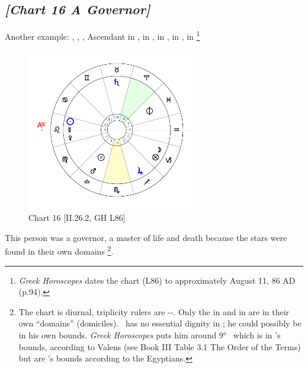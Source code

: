 \newpage
\subsection*{\textit{[Chart 16 A Governor]}}

Another example: \Sun, \Mercury, \Venus, Ascendant in \Leo, \Saturn\xspace in \Taurus, \Jupiter\xspace in \Sagittarius, \Mars\xspace in \Libra, \Moon\xspace in \Capricorn
\footnote{\textit{Greek Horoscopes} dates the chart (L86) to approximately August 11, 86 AD (p.94).}

\clearpage
\begin{figure}
\centering
\vspace{-20pt}
\includegraphics[width=0.68\textwidth]{charts/2_26_2}
\caption{Chart 16 [II.26.2, GH L86]}
\vspace{-150pt}
\label{fig:chart16}
\end{figure}

This person was a governor, a master of life and death because the stars were found in their own domains
\footnote{The chart is diurnal, triplicity rulers are \Sun-\Jupiter-\Saturn. Only the \Sun\xspace in \Leo\xspace and \Jupiter\xspace in \Sagittarius\xspace are in their own ``domains'' (domiciles). \Saturn\, has no essential dignity in \Taurus; he could possibly be in his own bounds. \textsl{Greek Horoscopes} puts him around 9° \Taurus\, which is in \Saturn's bounds, according to Valens (see Book III Table 3.1 The Order of the Terms) but are \Mercury's bounds according to the Egyptians.}.

\newpage

